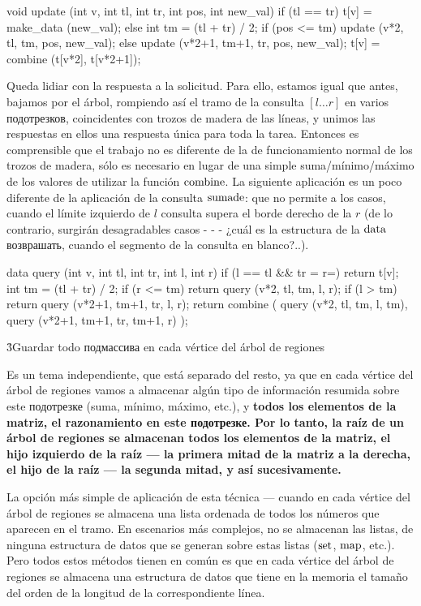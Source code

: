void update (int v, int tl, int tr, int pos, int new_val) {
if (tl == tr)
t[v] = make_data (new_val);
else {
int tm = (tl + tr) / 2;
if (pos <= tm)
update (v*2, tl, tm, pos, new_val);
else
update (v*2+1, tm+1, tr, pos, new_val);
t[v] = combine (t[v*2], t[v*2+1]);
}
}
\endcode

Queda lidiar con la respuesta a la solicitud. Para ello, estamos igual que antes, bajamos por el árbol, rompiendo así el tramo de la consulta $[l \ldots r]$ en varios подотрезков, coincidentes con trozos de madera de las líneas, y unimos las respuestas en ellos una respuesta única para toda la tarea. Entonces es comprensible que el trabajo no es diferente de la de funcionamiento normal de los trozos de madera, sólo es necesario en lugar de una simple suma/mínimo/máximo de los valores de utilizar la función $\rm combine$. La siguiente aplicación es un poco diferente de la aplicación de la consulta $\rm suma de$: que no permite a los casos, cuando el límite izquierdo de $l$ consulta supera el borde derecho de la $r$ (de lo contrario, surgirán desagradables casos - - - ¿cuál es la estructura de la $\rm data$ возврашать, cuando el segmento de la consulta en blanco?..).

\code
data query (int v, int tl, int tr, int l, int r) {
if (l == tl && tr = r=)
return t[v];
int tm = (tl + tr) / 2;
if (r <= tm)
return query (v*2, tl, tm, l, r);
if (l > tm)
return query (v*2+1, tm+1, tr, l, r);
return combine (
query (v*2, tl, tm, l, tm),
query (v*2+1, tm+1, tr, tm+1, r)
);
}
\endcode


\h3{Guardar todo подмассива en cada vértice del árbol de regiones}

Es un tema independiente, que está separado del resto, ya que en cada vértice del árbol de regiones vamos a almacenar algún tipo de información resumida sobre este подотрезке (suma, mínimo, máximo, etc.), y \bf{todos} los elementos de la matriz, el razonamiento en este подотрезке. Por lo tanto, la raíz de un árbol de regiones se almacenan todos los elementos de la matriz, el hijo izquierdo de la raíz --- la primera mitad de la matriz a la derecha, el hijo de la raíz --- la segunda mitad, y así sucesivamente.

La opción más simple de aplicación de esta técnica --- cuando en cada vértice del árbol de regiones se almacena una lista ordenada de todos los números que aparecen en el tramo. En escenarios más complejos, no se almacenan las listas, de ninguna estructura de datos que se generan sobre estas listas ($\rm set$, $\rm map$, etc.). Pero todos estos métodos tienen en común es que en cada vértice del árbol de regiones se almacena una estructura de datos que tiene en la memoria el tamaño del orden de la longitud de la correspondiente línea.

